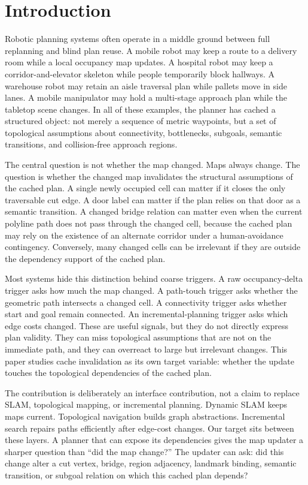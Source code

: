 \documentclass{article}
\begin{document}
\section{Introduction}

Robotic planning systems often operate in a middle ground between full replanning and blind plan reuse. A mobile robot may keep a route to a delivery room while a local occupancy map updates. A hospital robot may keep a corridor-and-elevator skeleton while people temporarily block hallways. A warehouse robot may retain an aisle traversal plan while pallets move in side lanes. A mobile manipulator may hold a multi-stage approach plan while the tabletop scene changes. In all of these examples, the planner has cached a structured object: not merely a sequence of metric waypoints, but a set of topological assumptions about connectivity, bottlenecks, subgoals, semantic transitions, and collision-free approach regions.

The central question is not whether the map changed. Maps always change. The question is whether the changed map invalidates the structural assumptions of the cached plan. A single newly occupied cell can matter if it closes the only traversable cut edge. A door label can matter if the plan relies on that door as a semantic transition. A changed bridge relation can matter even when the current polyline path does not pass through the changed cell, because the cached plan may rely on the existence of an alternate corridor under a human-avoidance contingency. Conversely, many changed cells can be irrelevant if they are outside the dependency support of the cached plan.

Most systems hide this distinction behind coarse triggers. A raw occupancy-delta trigger asks how much the map changed. A path-touch trigger asks whether the geometric path intersects a changed cell. A connectivity trigger asks whether start and goal remain connected. An incremental-planning trigger asks which edge costs changed. These are useful signals, but they do not directly express plan validity. They can miss topological assumptions that are not on the immediate path, and they can overreact to large but irrelevant changes. This paper studies cache invalidation as its own target variable: whether the update touches the topological dependencies of the cached plan.

The contribution is deliberately an interface contribution, not a claim to replace SLAM, topological mapping, or incremental planning. Dynamic SLAM keeps maps current. Topological navigation builds graph abstractions. Incremental search repairs paths efficiently after edge-cost changes. Our target sits between these layers. A planner that can expose its dependencies gives the map updater a sharper question than ``did the map change?'' The updater can ask: did this change alter a cut vertex, bridge, region adjacency, landmark binding, semantic transition, or subgoal relation on which this cached plan depends?
\end{document}
